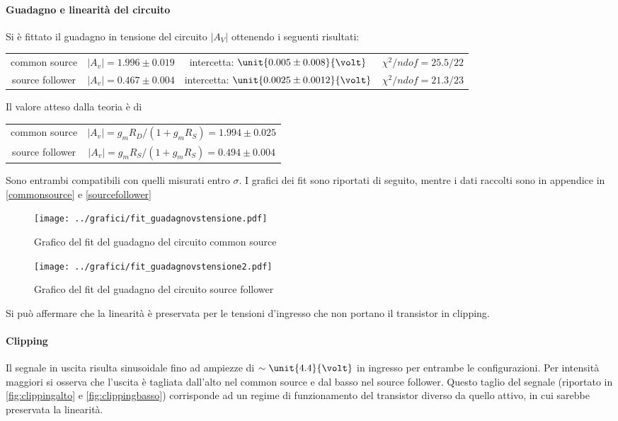 \documentclass[10pt,a4paper]{article}
\begin{document}
\paragraph{Guadagno e linearità del circuito} Si è fittato il guadagno in tensione del circuito $|A_V|$ ottenendo i seguenti risultati:
\begin{table}[h!]
	\centering
	\begin{tabular}{cccc}
		common source & $|A_v| = 1.996 \pm 0.019$ & intercetta: $\unit{0.005 \pm 0.008}{\volt}$ & $\chi^2 / ndof = 25.5 / 22$\\
		source follower &	$|A_v| = 0.467 \pm 0.004$ & intercetta: $\unit{0.0025 \pm 0.0012}{\volt}$ & $\chi^2 / ndof = 21.3 / 23$
	\end{tabular}
\end{table}

Il valore atteso dalla teoria è di

\begin{table}[h!]
	\centering
	\begin{tabular}{cc}
		common source & $|A_v| =g_mR_D/(1+g_mR_S) = 1.994 \pm 0.025$ \\
		source follower &	$|A_v| =g_mR_S/(1+g_mR_S) = 0.494 \pm 0.004
		 $
	\end{tabular}
\end{table}

Sono entrambi compatibili con quelli misurati entro $\sigma$.
I grafici dei fit sono riportati di seguito, mentre i dati raccolti sono in appendice in \tablename{\ref{commonsource}} e \tablename{\ref{sourcefollower}}

\begin{figure}[h!]
	\centering
	\texttt{[image: ../grafici/fit\_guadagnovstensione.pdf]}
	\caption{Grafico del fit del guadagno del circuito common source}
\end{figure}
\begin{figure}[h!]
	\centering
	\texttt{[image: ../grafici/fit\_guadagnovstensione2.pdf]}
	\caption{Grafico del fit del guadagno del circuito source follower}
\end{figure}

 Si può affermare che la linearità è preservata per le tensioni d'ingresso che non portano il transistor in clipping.
  
 \paragraph{Clipping}
Il segnale in uscita risulta sinusoidale fino ad ampiezze di $\sim \unit{4.4}{\volt}$ in ingresso per entrambe le configurazioni.
Per intensità maggiori si osserva che l'uscita è tagliata dall'alto nel common source e dal basso nel source follower. Questo taglio del segnale (riportato in \figurename{\ref{fig:clippingalto}} e \figurename{\ref{fig:clippingbasso}}) corrisponde ad un regime di funzionamento del transistor diverso da quello attivo, in cui sarebbe preservata la linearità.
\end{document}
